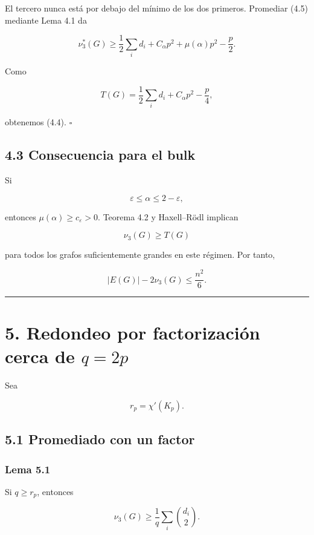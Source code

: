 \documentclass[
  spanish,
  11pt,
  a4paper,
]{article}
\begin{document}
El tercero nunca está por debajo del mínimo de los dos primeros. Promediar (4.5) mediante Lema 4.1 da

\[
\nu_3^*(G)
\ge
\frac12\sum_i d_i+C_\alpha p^2+\mu(\alpha)p^2-\frac p2.
\]

Como

\[
T(G)=\frac12\sum_i d_i+C_\alpha p^2-\frac p4,
\]

obtenemos (4.4). \(\square\)

\subsection{4.3 Consecuencia para el bulk}\label{consecuencia-para-el-bulk}

Si

\[
\varepsilon\le\alpha\le2-\varepsilon,
\]

entonces \(\mu(\alpha)\ge c_\varepsilon>0\). Teorema 4.2 y Haxell--Rödl implican

\[
\nu_3(G)\ge T(G)
\]

para todos los grafos suficientemente grandes en este régimen. Por tanto,

\[
|E(G)|-2\nu_3(G)
\le
\frac{n^2}{6}.
\tag{4.6}
\]

\begin{center}\rule{0.5\linewidth}{0.5pt}\end{center}

\section{\texorpdfstring{5. Redondeo por factorización cerca de \(q=2p\)}{5. Redondeo por factorización cerca de q=2p}}\label{redondeo-por-factorizaciuxf3n-cerca-de-q2p}

Sea

\[
r_p=\chi'(K_p).
\]

\subsection{5.1 Promediado con un factor}\label{promediado-con-un-factor}

\subsubsection{Lema 5.1}\label{lema-5.1}

Si \(q\ge r_p\), entonces

\[
\boxed{
\nu_3(G)
\ge
\frac1q\sum_i\binom{d_i}{2}.
}
\tag{5.1}
\]
\end{document}
